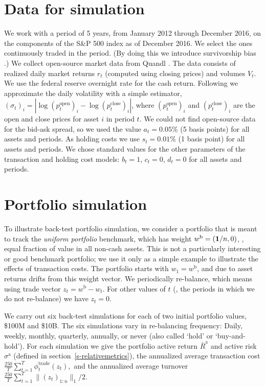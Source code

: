 \documentclass[openany]{article}  %
\newcommand{\wb}{w^\mathrm{b}}
\renewcommand{\S}{section~}
\begin{document}
\section{Data for simulation}
\label{s-example-data}
We work with a period of 5 years, from January 2012 through December 2016,
on the components of the S\&P 500 index
as of December 2016.
We select the ones continuously traded in the period.
(By doing this we introduce survivorship bias \cite{elton1996survivor}.)
We collect open-source market data from
Quandl \cite{QuandlWIKI}.
The data consists of realized daily market returns $r_t$ (computed using
closing prices) and volumes $V_t$.
We use the federal reserve overnight rate for the cash return.
Following \cite{almgren09}
we approximate the daily volatility with a simple estimator,
$(\sigma_t)_i =
|\log (p_t^\text{open})_i -\log (p_t^\text{close})_i|$,
where $(p_t^\text{open})_i$ and
$(p_t^\text{close})_i$ are the open and close prices
for asset $i$ in period $t$.
We could not find open-source data for the bid-ask spread,
so we used the value $a_t = 0.05\%$ (5 basis points) for all
assets and periods.
As holding costs we use
$s_t = 0.01\%$ (1 basis point) for all assets and periods.
We chose standard values for the other parameters
of the transaction and holding
cost models: $b_t = 1$, $c_t = 0$, $d_t = 0$ for all assets and periods.

\section{Portfolio simulation}
To illustrate back-test portfolio simulation,
we consider a portfolio that is meant to track the \emph{uniform portfolio}
benchmark, which has weight $\wb = (\ones/n, 0)$,
\ie, equal fraction of value in all non-cash assets.
This is not a particularly interesting or good benchmark portfolio;
we use it only as a simple example to illustrate the effects
of transaction costs.
The portfolio starts with $w_1 = w^\mathrm{b}$, and due to asset returns
drifts from this weight vector.  We periodically re-balance, which means
using trade vector $z_t = w^\text{b} - w_t$. For other values of $t$
(\ie, the periods in which we do not re-balance) we have $z_t=0$.

We carry out six back-test simulations for each of two initial portfolio
values, \$100M and \$10B.
The six simulations vary in re-balancing frequency:
Daily, weekly, monthly, quarterly, annually, or never (also called `hold'
or `buy-and-hold').
For each simulation we give the portfolio active return $\bar R^\mathrm{a}$
and active risk $\sigma^\mathrm{a}$
(defined in \S\ref{s-relativemetrics}),
the annualized average transaction cost
$
\frac{250}{T}\sum_{t=1}^{T} \phi_t^\text{trade}(z_t),
$
and the annualized average turnover
$
\frac{250}{T}\sum_{t=1}^{T} \|(z_t)_{1:n}\|_1/2.
$
\end{document}
